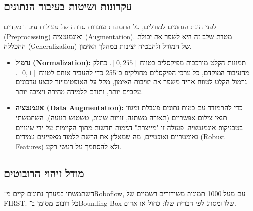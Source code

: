 \subsection{עקרונות ושיטות בעיבוד הנתונים}

לפני הזנת הנתונים למודלים, כל התמונות עוברות סדרה של פעולות עיבוד
מקדים (\textenglish{Preprocessing}) ואוגמנטציה
(\textenglish{Augmentation}). מטרת שלב זה היא לשפר את יכולת ההכללה
(\textenglish{Generalization}) של המודל ולהבטיח יציבות במהלך האימון.

\begin{itemize}
\item \textbf{נרמול (\textenglish{Normalization}):} תמונות הקלט
  מורכבות מפיקסלים בטווח \([0,255]\). כחלק מהעיבוד המוקדם, כל ערכי
  הפיקסלים מחולקים ב־255 כדי להעביר אותם לטווח \([0,1]\). נרמול הקלט
  לטווח אחיד משפר את יציבות האימון, מקל על האופטימייזר לבצע עדכונים
  עקביים יותר, ותורם ללמידה מהירה ויציבה יותר.
  
\item \textbf{אוגמנטציה (\textenglish{Data Augmentation}):} כדי
  להתמודד עם כמות נתונים מוגבלת ומגוון תנאי צילום אפשריים (תאורה
  משתנה, זוויות שונות, טשטוש תנועה), השתמשתי בטכניקות אוגמנטציה. פעולה
  זו "מייצרת" דגימות חדשות מתוך הקיימות על ידי שינויים גאומטריים
  ואופטיים, מה שמאלץ את הרשת ללמוד מאפיינים עמידים
  (\textenglish{Robust Features}) ולא להסתמך על רעשי רקע.
\end{itemize}

\subsection{מודל זיהוי הרובוטים}

השתמשתי
ב\href{https://universe.roboflow.com/main-wcgiu/robot-detection-xru6m/16}{מערך
  נתונים} קיים מ־Roboflow, עם מעל 1000 תמונות משידורים רשמיים של
\textenglish{FIRST}. כל רובוט מסומן ב־\textenglish{Bounding Box} שלו
ומסווג לפי הברית שלו: כחול או אדום.

